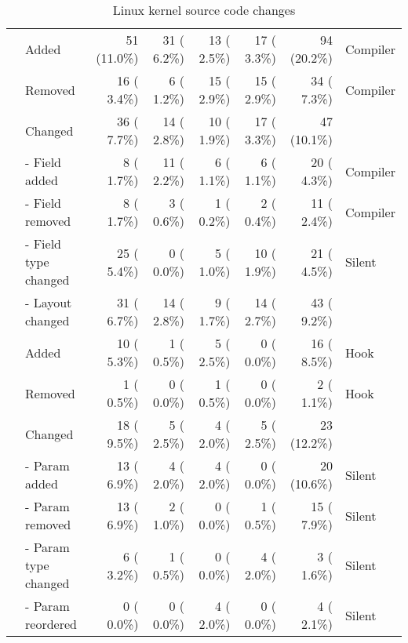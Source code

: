 \begin{table*}[t]
\begin{tabular}{c|l||r|r|r|r|r|l}
    \hline
    \chead{7}{Tracepoint Event}
     & Added                        & 51 (11.0\%)    & 31 ( 6.2\%)     & 13 ( 2.5\%)      & 17 ( 3.3\%)      & 94 (20.2\%)   & Compiler \\
     & Removed                      & 16 ( 3.4\%)    & 6 ( 1.2\%)      & 15 ( 2.9\%)      & 15 ( 2.9\%)      & 34 ( 7.3\%)   & Compiler \\
     & Changed                      & 36 ( 7.7\%)    & 14 ( 2.8\%)     & 10 ( 1.9\%)      & 17 ( 3.3\%)      & 47 (10.1\%)              \\
     & - Field added                & 8 ( 1.7\%)     & 11 ( 2.2\%)     & 6 ( 1.1\%)       & 6 ( 1.1\%)       & 20 ( 4.3\%)   & Compiler \\
     & - Field removed              & 8 ( 1.7\%)     & 3 ( 0.6\%)      & 1 ( 0.2\%)       & 2 ( 0.4\%)       & 11 ( 2.4\%)   & Compiler \\
     & - Field type changed         & 25 ( 5.4\%)    & 0 ( 0.0\%)      & 5 ( 1.0\%)       & 10 ( 1.9\%)      & 21 ( 4.5\%)   & Silent   \\
     & - Layout changed             & 31 ( 6.7\%)    & 14 ( 2.8\%)     & 9 ( 1.7\%)       & 14 ( 2.7\%)      & 43 ( 9.2\%)              \\
    \hline
    \chead{8}{LSM Hook}
     & Added                        & 10 ( 5.3\%)    & 1 ( 0.5\%)      & 5 ( 2.5\%)       & 0 ( 0.0\%)       & 16 ( 8.5\%)   & Hook     \\
     & Removed                      & 1 ( 0.5\%)     & 0 ( 0.0\%)      & 1 ( 0.5\%)       & 0 ( 0.0\%)       & 2 ( 1.1\%)    & Hook     \\
     & Changed                      & 18 ( 9.5\%)    & 5 ( 2.5\%)      & 4 ( 2.0\%)       & 5 ( 2.5\%)       & 23 (12.2\%)              \\
     & - Param added                & 13 ( 6.9\%)    & 4 ( 2.0\%)      & 4 ( 2.0\%)       & 0 ( 0.0\%)       & 20 (10.6\%)   & Silent   \\
     & - Param removed              & 13 ( 6.9\%)    & 2 ( 1.0\%)      & 0 ( 0.0\%)       & 1 ( 0.5\%)       & 15 ( 7.9\%)   & Silent   \\
     & - Param type changed         & 6 ( 3.2\%)     & 1 ( 0.5\%)      & 0 ( 0.0\%)       & 4 ( 2.0\%)       & 3 ( 1.6\%)    & Silent   \\
     & - Param reordered            & 0 ( 0.0\%)     & 0 ( 0.0\%)      & 4 ( 2.0\%)       & 0 ( 0.0\%)       & 4 ( 2.1\%)    & Silent   \\
  \end{tabular}
  \caption{Linux kernel source code changes}
  \label{tab:kernel_source_code_changes}
\end{table*}

